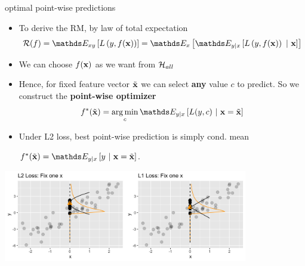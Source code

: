\documentclass[11pt,compress,t,notes=noshow, xcolor=table]{beamer}
\begin{document}



\begin{frame}[t]{optimal point-wise predictions}  

\begin{itemize}

\item To derive the RM, by law of total expectation 
$$    \riskf = \E_{xy} \left[\Lxy\right] 
    = \E_x \left[\E_{y|x}\left[\Lxy~|~\xv\right]\right]$$

	\item We can choose $f(\mathbf{x})$ as we want from $\mathcal{H}_{all}$ %
	\item Hence, for fixed feature vector $\tilde{\mathbf{x}}$ we can select \textbf{any} value $c$ to predict. So we construct the \textbf{point-wise optimizer} 
 $$\fbayes(\xtil) = \argmin_c \E_{y|x}\left[L(y, c)~|~ \xv = \xtil \right] $$
        \item Under L2 loss, best point-wise prediction is simply cond. mean

$f^{\ast}(\xtil) = \E_{y|x} \left[y ~|~ \xv = \xtil \right]$.
\end{itemize}

\begin{center}
\includegraphics[width=0.8\textwidth]{figure/optimal_pointwise.png}
\end{center}


\end{frame}
\end{document}
